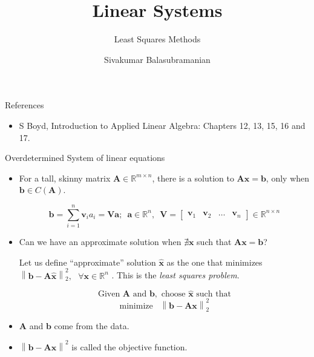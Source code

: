 \documentclass[aspectratio=169]{beamer}
\title{Linear Systems}
\subtitle{Least Squares Methods}
\author{Sivakumar Balasubramanian}
\institute[Christian Medical College] %
{
  \inst{}%
  Department of Bioengineering\\
  Christian Medical College, Bagayam\\
  Vellore 632002
}
\date{}
\begin{document}


\begin{frame}
  \titlepage
\end{frame}

\begin{frame}[t]{References}
\begin{itemize}
    \item S Boyd, Introduction to Applied Linear Algebra: Chapters 12, 13, 15, 16 and 17. 
\end{itemize} 
\end{frame}


\begin{frame}[t]{Overdetermined System of linear equations}
\begin{itemize}
\item For a tall, skinny matrix $\mathbf{A} \in \mathbb{R}^{m \times n}$, there is a solution to $\mathbf{Ax} = \mathbf{b}$, only when $\mathbf{b} \in C\left(\mathbf{A}\right)$.

\[ \mathbf{b} = \sum_{i=1}^{n} \mathbf{v}_i a_i = \mathbf{V}\mathbf{a}; \,\,\, \mathbf{a} \in \mathbb{R}^n, \,\,\, \mathbf{V} = \begin{bmatrix*}\mathbf{v}_1 & \mathbf{v}_2 & \ldots & \mathbf{v}_n\end{bmatrix*} \in \mathbb{R}^{n \times n} \]

\item Can we have an approximate solution when $\nexists \mathbf{x}$ such that $\mathbf{Ax} = \mathbf{b}$?

Let us define ``approximate'' solution $\hat{\mathbf{x}}$ as the one that minimizes $\left\lVert \mathbf{b} - \mathbf{A}\hat{\mathbf{x}}\right\rVert_2^2, \,\,\,\, \forall \mathbf{x} \in \mathbb{R}^n$ . This is the \textit{least squares problem}.

\[ \text{Given } \mathbf{A} \text{ and } \mathbf{b}, \text{ choose } \hat{\mathbf{x}} \text{ such that} \] \[ \text{minimize }\,\,\, \left\lVert \mathbf{b} - \mathbf{Ax}\right\rVert_2^2 \]

\item $\mathbf{A}$ and $\mathbf{b}$ come from the data.

\item $\left\lVert \mathbf{b} - \mathbf{Ax}\right\rVert^2$ is called the objective function.
\end{itemize}
\end{frame}
\end{document}
